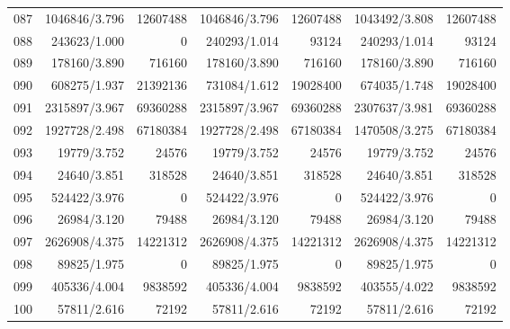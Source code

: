 \begin{longtable}{crrrrrr}
087 & 1046846/3.796 & 12607488 & 1046846/3.796 & 12607488 & 1043492/3.808 & 12607488 \\
088 & 243623/1.000 & 0 & 240293/1.014 & 93124 & 240293/1.014 & 93124 \\
089 & 178160/3.890 & 716160 & 178160/3.890 & 716160 & 178160/3.890 & 716160 \\
090 & 608275/1.937 & 21392136 & 731084/1.612 & 19028400 & 674035/1.748 & 19028400 \\
091 & 2315897/3.967 & 69360288 & 2315897/3.967 & 69360288 & 2307637/3.981 & 69360288 \\
092 & 1927728/2.498 & 67180384 & 1927728/2.498 & 67180384 & 1470508/3.275 & 67180384 \\
093 & 19779/3.752 & 24576 & 19779/3.752 & 24576 & 19779/3.752 & 24576 \\
094 & 24640/3.851 & 318528 & 24640/3.851 & 318528 & 24640/3.851 & 318528 \\
095 & 524422/3.976 & 0 & 524422/3.976 & 0 & 524422/3.976 & 0 \\
096 & 26984/3.120 & 79488 & 26984/3.120 & 79488 & 26984/3.120 & 79488 \\
097 & 2626908/4.375 & 14221312 & 2626908/4.375 & 14221312 & 2626908/4.375 & 14221312 \\
098 & 89825/1.975 & 0 & 89825/1.975 & 0 & 89825/1.975 & 0 \\
099 & 405336/4.004 & 9838592 & 405336/4.004 & 9838592 & 403555/4.022 & 9838592 \\
100 & 57811/2.616 & 72192 & 57811/2.616 & 72192 & 57811/2.616 & 72192 \\
\end{longtable}


